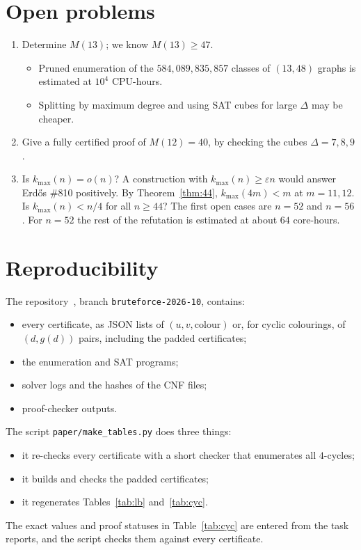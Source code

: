 \documentclass[11pt]{amsart}
\theoremstyle{definition}
\newcommand{\M}{M}
\newcommand{\kmax}{k_{\max}}
\begin{document}
\section{Open problems}

\begin{enumerate}
\item Determine $\M(13)$; we know $\M(13)\ge 47$.
  \begin{itemize}
  \item Pruned enumeration of the $584{,}089{,}835{,}857$ classes of $(13,48)$ graphs is
    estimated at $10^4$ CPU-hours.
  \item Splitting by maximum degree and using SAT cubes for large $\Delta$ may be cheaper.
  \end{itemize}
\item Give a fully certified proof of $\M(12)=40$, by checking the cubes $\Delta=7,8,9$.
\item Is $\kmax(n)=o(n)$? A construction with $\kmax(n)\ge\varepsilon n$ would answer
  Erd\H{o}s \#810 positively. By Theorem~\ref{thm:44}, $\kmax(4m)<m$ at $m=11,12$. Is
  $\kmax(n)<n/4$ for all $n\ge44$? The first open cases are $n=52$ and $n=56$. For $n=52$ the
  rest of the refutation is estimated at about $64$ core-hours.
\end{enumerate}

\appendix
\section{Reproducibility}\label{app:repro}

The repository~\cite{Repo}, branch \texttt{bruteforce-2026-10}, contains:
\begin{itemize}
\item every certificate, as JSON lists of $(u,v,\text{colour})$ or, for cyclic colourings,
  of $(d,g(d))$ pairs, including the padded certificates;
\item the enumeration and SAT programs;
\item solver logs and the hashes of the CNF files;
\item proof-checker outputs.
\end{itemize}

The script \texttt{paper/make\_tables.py} does three things:
\begin{itemize}
\item it re-checks every certificate with a short checker that enumerates all $4$-cycles;
\item it builds and checks the padded certificates;
\item it regenerates Tables~\ref{tab:lb} and~\ref{tab:cyc}.
\end{itemize}
The exact values and proof statuses in Table~\ref{tab:cyc} are entered from the task
reports, and the script checks them against every certificate.
\end{document}
